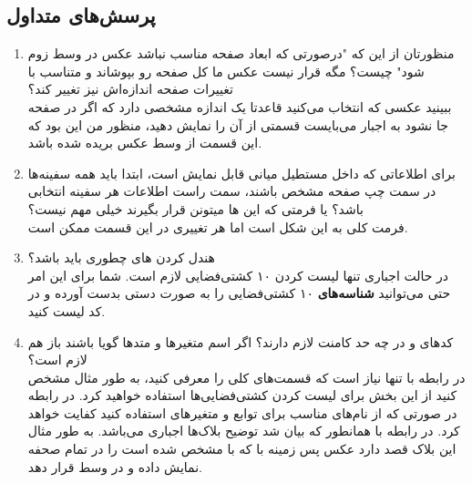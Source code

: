 \documentclass[../main.tex]{subfiles}
\begin{document}
\subsection{پرسش‌های متداول}

\begin{enumerate}
  \item منظورتان از این که "درصورتی که ابعاد صفحه مناسب نباشد عکس در وسط زوم شود" چیست؟ مگه قرار نیست عکس ما کل صفحه رو بپوشاند و متناسب با تغییرات صفحه اندازه‌اش نیز تغییر کند؟\\
        ببینید عکسی که انتخاب می‌کنید قاعدتا یک اندازه مشخصی دارد که اگر در صفحه جا نشود به اجبار می‌بایست قسمتی از آن را نمایش دهید، منظور من این بود که این قسمت از وسط عکس بریده شده باشد.
  \item برای اطلاعاتی که داخل مستطیل میانی قابل نمایش است، ابتدا باید همه سفینه‌ها در سمت چپ صفحه مشخص باشند، سمت راست اطلاعات هر سفینه انتخابی باشد؟ یا فرمتی که این ها میتونن قرار بگیرند خیلی مهم نیست؟\\
        فرمت کلی به این شکل است اما هر تغییری در این قسمت ممکن است.
  \item هندل کردن ‌های  چطوری باید باشد؟\\
        در حالت اجباری تنها لیست کردن ۱۰ کشتی‌فضایی لازم است. شما برای این امر حتی می‌توانید \textbf{شناسه‌های} ۱۰ کشتی‌فضایی را به صورت دستی بدست آورده و در کد لیست کنید.
  \item کدهای  و  در چه حد کامنت لازم دارند؟ اگر اسم متغیرها و متدها گویا باشند باز هم لازم است؟\\
        در رابطه با  تنها نیاز است که قسمت‌های کلی را معرفی کنید، به طور مثال مشخص کنید از این بخش برای لیست کردن کشتی‌فضایی‌ها استفاده خواهید کرد. در رابطه  در صورتی که از نام‌های مناسب برای توابع و متغیرهای استفاده کنید کفایت خواهد کرد. در رابطه با  همانطور که بیان شد توضیح بلاک‌ها اجباری می‌باشد. به طور مثال این بلاک قصد دارد عکس پس زمینه با که با  مشخص شده است را در تمام صحفه نمایش داده و در وسط قرار دهد.
\end{enumerate}
\end{document}
